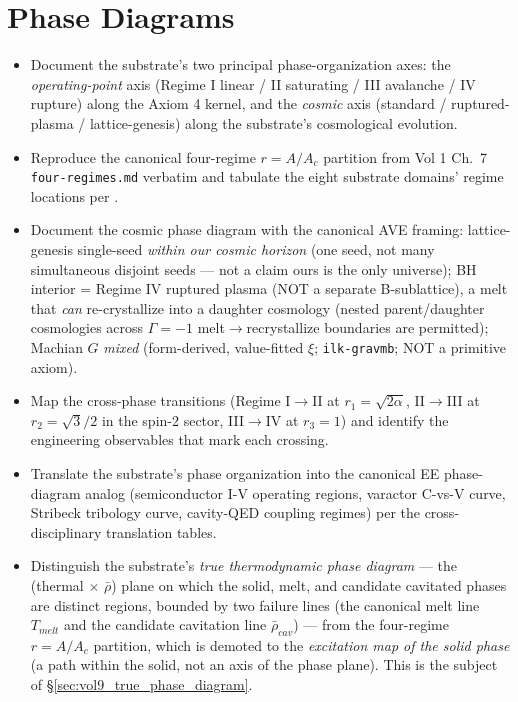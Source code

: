 \chapter{Phase Diagrams}
\label{ch:vol9_phase_diagrams}

\begin{objectivebox}
\begin{itemize}
    \item Document the substrate's two principal phase-organization axes: the \emph{operating-point} axis (Regime I linear / II saturating / III avalanche / IV rupture) along the Axiom 4 kernel, and the \emph{cosmic} axis (standard / ruptured-plasma / lattice-genesis) along the substrate's cosmological evolution.
    \item Reproduce the canonical four-regime $r = A/A_c$ partition from Vol 1 Ch.~7 \texttt{four-regimes.md} verbatim and tabulate the eight substrate domains' regime locations per .
    \item Document the cosmic phase diagram with the canonical AVE framing: lattice-genesis single-seed \emph{within our cosmic horizon} (one seed, not many simultaneous disjoint seeds --- not a claim ours is the only universe); BH interior = Regime IV ruptured plasma (NOT a separate B-sublattice), a melt that \emph{can} re-crystallize into a daughter cosmology (nested parent/daughter cosmologies across $\Gamma=-1$\gammaundeclared{} melt$\to$recrystallize boundaries are permitted); Machian $G$ \emph{mixed} (form-derived, value-fitted $\xi$;  \texttt{ilk-gravmb}; NOT a primitive axiom).
    \item Map the cross-phase transitions (Regime I$\to$II at $r_1 = \sqrt{2\alpha}$, II$\to$III at $r_2 = \sqrt{3}/2$ in the spin-2 sector, III$\to$IV at $r_3 = 1$) and identify the engineering observables that mark each crossing.
    \item Translate the substrate's phase organization into the canonical EE phase-diagram analog (semiconductor I-V operating regions, varactor C-vs-V curve, Stribeck tribology curve, cavity-QED coupling regimes) per the cross-disciplinary translation tables.
    \item Distinguish the substrate's \emph{true thermodynamic phase diagram} --- the (thermal $\times$ $\bar\rho$) plane on which the solid, melt, and candidate cavitated phases are distinct regions, bounded by two failure lines (the canonical melt line $T_{melt}$ and the candidate cavitation line $\bar\rho_{cav}$) --- from the four-regime $r = A/A_c$ partition, which is demoted to the \emph{excitation map of the solid phase} (a path within the solid, not an axis of the phase plane). This is the subject of \S\ref{sec:vol9_true_phase_diagram}.
\end{itemize}
\end{objectivebox}

